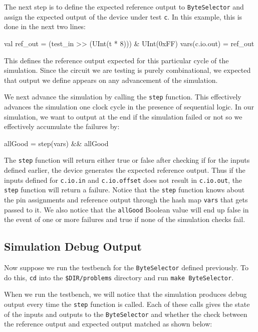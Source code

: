 \documentclass[twocolumn, 10pt]{article}
\begin{document}
The next step is to define the expected reference output to \verb+ByteSelector+ and assign the expected output of the device under test \verb+c+. In this example, this is done in the next two lines:

\begin{scala}
val ref_out = (test_in >> (UInt(t * 8))) & UInt(0xFF)
vars(c.io.out) = ref_out
\end{scala}

This defines the reference output expected for this particular cycle of the simulation. Since the circuit we are testing is purely combinational, we expected that output we define appears on any advancement of the simulation.

We next advance the simulation by calling the \verb+step+ function. This effectively advances the simulation one clock cycle in the presence of sequential logic. In our simulation, we want to output at the end if the simulation failed or not so we effectively accumulate the failures by:

\begin{scala}
allGood = step(vars) && allGood
\end{scala}

The \verb+step+ function will return either true or false after checking if for the inputs defined earlier, the device generates the expected reference output. Thus if the inputs defined for \verb+c.io.in+ and \verb+c.io.offset+ does not result in \verb+c.io.out+, the \verb+step+ function will return a failure. Notice that the \verb+step+ function knows about the pin assignments and reference output through the hash map \verb+vars+ that gets passed to it. We also notice that the \verb+allGood+ Boolean value will end up false in the event of one or more failures and true if none of the simulation checks fail.

\subsection{Simulation Debug Output}

Now suppose we run the testbench for the \verb+ByteSelector+ defined previously. To do this, \verb+cd+ into the \verb+$DIR/problems+ directory and run \verb+make ByteSelector+.

When we run the testbench, we will notice that the simulation produces debug output every time the \verb+step+ function is called. Each of these calls gives the state of the inputs and outputs to the \verb+ByteSelector+ and whether the check between the reference output and expected output matched as shown below:
\end{document}
